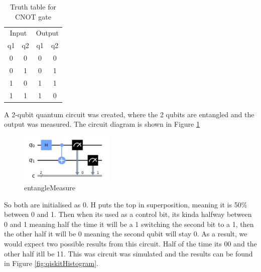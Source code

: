 \begin{table}[]
\centering
\begin{tabular}{cccc}
\multicolumn{2}{c}{Input}                         & \multicolumn{2}{c}{Output}   \\ 
\multicolumn{1}{c|}{q1} & \multicolumn{1}{c||}{q2} & \multicolumn{1}{c|}{q1} & q2 \\ \hline\hline
\multicolumn{1}{c|}{0}  & \multicolumn{1}{c||}{0}  & \multicolumn{1}{c|}{0}  & 0  \\ \hline
\multicolumn{1}{c|}{0}  & \multicolumn{1}{c||}{1}  & \multicolumn{1}{c|}{0}  & 1  \\ \hline
\multicolumn{1}{c|}{1}  & \multicolumn{1}{c||}{0}  & \multicolumn{1}{c|}{1}  & 1  \\ \hline
\multicolumn{1}{c|}{1}  & \multicolumn{1}{c||}{1}  & \multicolumn{1}{c|}{1}  & 0 
\end{tabular}
\label{tab:cNotTruth}
\caption{Truth table for CNOT gate}
\end{table}




A 2-qubit quantum circuit was created, where the 2 qubits are entangled and the output was measured. The circuit diagram is shown in Figure \ref{fig:entangleMeasure}

\begin{figure}[h]
    \centering
    \includegraphics[width=0.4\textwidth]{lab2/images/entangleMeasure.png}
    \caption{entangleMeasure} 
    \label{fig:entangleMeasure}
\end{figure}

So both are initialised as 0. H puts the top in superposition, meaning it is 50\% between 0 and 1. Then when its used as a control bit, its kinda halfway between 0 and 1 meaning half the time it will be a 1 switching the second bit to a 1, then the other half it will be 0 meaning the second qubit will stay 0. As a result, we would expect two possible results from this circuit. Half of the time its 00 and the other half itll be 11. This was circuit was simulated and the results can be found in Figure \ref{fig:qiskitHistogram}.

